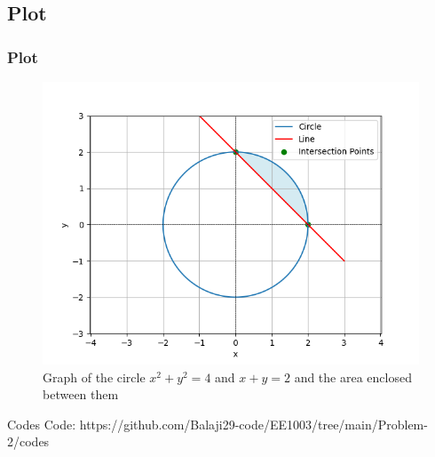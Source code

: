 \documentclass{beamer}
\theoremstyle{remark}
\numberwithin{equation}{section}
\begin{document}
\subsection{Plot}
\begin{frame}
\frametitle{Plot}
\begin{figure}[h!]
   \centering
   \includegraphics[width=1\columnwidth]{figs/fig.png}
   \caption{Graph of the circle $x^2 + y^2 = 4$ and $x + y = 2 $ and the area enclosed between them}
   \label{stemplot}
\end{figure}
\end{frame}
\begin{frame}{Codes}
   Code: https://github.com/Balaji29-code/EE1003/tree/main/Problem-2/codes
\end{frame}
\end{document}
